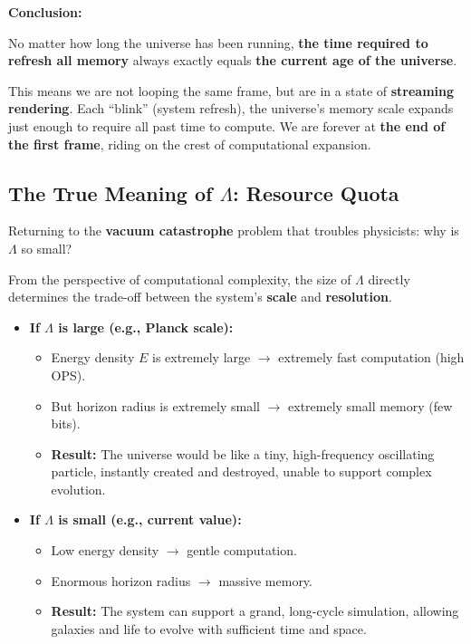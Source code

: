 \documentclass[11pt,a4paper,twoside]{book}
\begin{document}
\textbf{Conclusion:}

No matter how long the universe has been running, \textbf{the time required to refresh all memory} always exactly equals \textbf{the current age of the universe}.

This means we are not looping the same frame, but are in a state of \textbf{streaming rendering}. Each ``blink'' (system refresh), the universe's memory scale expands just enough to require all past time to compute. We are forever at \textbf{the end of the first frame}, riding on the crest of computational expansion.

\subsection{The True Meaning of $\Lambda$: Resource Quota}

Returning to the \textbf{vacuum catastrophe} problem that troubles physicists: why is $\Lambda$ so small?

From the perspective of computational complexity, the size of $\Lambda$ directly determines the trade-off between the system's \textbf{scale} and \textbf{resolution}.

\begin{itemize}
\item \textbf{If $\Lambda$ is large (e.g., Planck scale):}

    \begin{itemize}
    \item Energy density $E$ is extremely large $\to$ extremely fast computation (high OPS).

    \item But horizon radius is extremely small $\to$ extremely small memory (few bits).

    \item \textbf{Result:} The universe would be like a tiny, high-frequency oscillating particle, instantly created and destroyed, unable to support complex evolution.
    \end{itemize}

\item \textbf{If $\Lambda$ is small (e.g., current value):}

    \begin{itemize}
    \item Low energy density $\to$ gentle computation.

    \item Enormous horizon radius $\to$ massive memory.

    \item \textbf{Result:} The system can support a grand, long-cycle simulation, allowing galaxies and life to evolve with sufficient time and space.
    \end{itemize}
\end{itemize}
\end{document}
